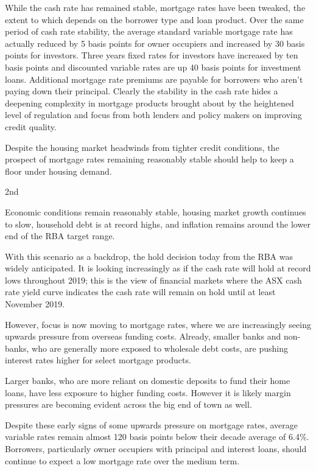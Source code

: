 \documentclass[AEJ,reqno, draftmode]{AEA}
\begin{document}
While the cash rate has remained stable, mortgage rates have been tweaked, the extent to which depends on the borrower type and loan product.  Over the same period of cash rate stability, the average standard variable mortgage rate has actually reduced by 5 basis points for owner occupiers and increased by 30 basis points for investors.   Three years fixed rates for investors have increased by ten basis points and discounted variable rates are up 40 basis points for investment loans.  Additional mortgage rate premiums are payable for borrowers who aren’t paying down their principal.  Clearly the stability in the cash rate hides a deepening complexity in mortgage products brought about by the heightened level of regulation and focus from both lenders and policy makers on improving credit quality.  

Despite the housing market headwinds from tighter credit conditions, the prospect of mortgage rates remaining reasonably stable should help to keep a floor under housing demand. 


2nd

Economic conditions remain reasonably stable, housing market growth continues to slow, household debt is at record highs, and inflation remains around the lower end of the RBA target range.
 
With this scenario as a backdrop, the hold decision today from the RBA was widely anticipated.  It is looking increasingly as if the cash rate will hold at record lows throughout 2019; this is the view of financial markets where the ASX cash rate yield curve indicates the cash rate will remain on hold until at least November 2019.
 
However, focus is now moving to mortgage rates, where we are increasingly seeing upwards pressure from overseas funding costs. Already, smaller banks and non-banks, who are generally more exposed to wholesale debt costs, are pushing interest rates higher for select mortgage products.
 
Larger banks, who are more reliant on domestic deposits to fund their home loans, have less exposure to higher funding costs. However it is likely margin pressures are becoming evident across the big end of town as well. 
 
Despite these early signs of some upwards pressure on mortgage rates, average variable rates remain almost 120 basis points below their decade average of 6.4\%. Borrowers, particularly owner occupiers with principal and interest loans, should continue to expect a low mortgage rate over the medium term.
 
\end{document}
